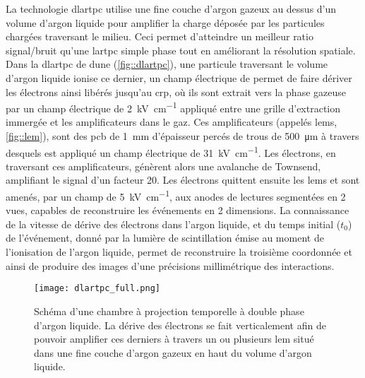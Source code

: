     La technologie \gls{dlartpc} utilise une fine couche d'argon gazeux au dessus d'un volume d'argon liquide pour amplifier la charge déposée par les particules chargées traversant le milieu. Ceci permet d'atteindre un meilleur ratio signal/bruit qu'une \gls{lartpc} simple phase tout en améliorant la résolution spatiale. Dans la \gls{dlartpc} de \gls{dune} (\autoref{fig::dlartpc}), une particule traversant le volume d'argon liquide ionise ce dernier, un champ électrique de \driftfield{} permet de faire dériver les électrons ainsi libérés jusqu'au \gls{crp}, où ils sont extrait vers la phase gazeuse par un champ électrique de \SI{2}{\kilo\volt\per\centi\meter} appliqué entre une grille d'extraction immergée et les amplificateurs dans le gaz. Ces amplificateurs (appelés \glspl{lem}, \autoref{fig::lem}), sont des \gls{pcb} de \SI{1}{\milli\meter} d'épaisseur percés de trous de \SI{500}{\micro\meter} à travers desquels est appliqué un champ électrique de  \SI{31}{\kilo\volt\per\centi\meter}. Les électrons, en traversant ces amplificateurs, génèrent alors une avalanche de Townsend, amplifiant le signal d'un facteur 20. Les électrons quittent ensuite les \glspl{lem} et sont amenés, par un champ de  \SI{5}{\kilo\volt\per\centi\meter}, aux anodes de lectures segmentées en 2 vues, capables de reconstruire les événements en 2 dimensions. La connaissance de la vitesse de dérive des électrons dans l'argon liquide, et du temps initial ($t_0$) de l'événement, donné par la lumière de scintillation émise au moment de l'ionisation de l'argon liquide, permet de reconstruire la troisième coordonnée et ainsi de produire des images d'une précisions millimétrique des interactions.

    \begin{figure}[htbp]
      \centering
      \texttt{[image: dlartpc\_full.png]}
      \caption[Schéma d'une chambre à projection temporelle à double phase d'argon liquide]{\label{fig::dlartpc}Schéma d'une chambre à projection temporelle à double phase d'argon liquide. La dérive des électrons se fait verticalement afin de pouvoir amplifier ces derniers à travers un ou plusieurs \acrfull{lem} situé dans une fine couche d'argon gazeux en haut du volume d'argon liquide.}
    \end{figure}
    
